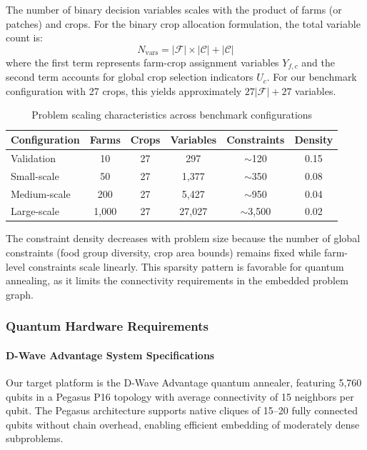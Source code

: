 \documentclass{oqireport}
\begin{document}
The number of binary decision variables scales with the product of farms (or patches) and crops. For the binary crop allocation formulation, the total variable count is:
\begin{equation}
N_{\text{vars}} = |\mathcal{F}| \times |\mathcal{C}| + |\mathcal{C}|
\end{equation}
where the first term represents farm-crop assignment variables $Y_{f,c}$ and the second term accounts for global crop selection indicators $U_c$. For our benchmark configuration with 27 crops, this yields approximately $27|\mathcal{F}| + 27$ variables.

\begin{table}[H]
\centering
\caption{Problem scaling characteristics across benchmark configurations}
\label{tab:problem_scaling}
\begin{tabular}{@{}lccccc@{}}
\toprule
\textbf{Configuration} & \textbf{Farms} & \textbf{Crops} & \textbf{Variables} & \textbf{Constraints} & \textbf{Density} \\
\midrule
Validation & 10 & 27 & 297 & $\sim$120 & 0.15 \\
Small-scale & 50 & 27 & 1,377 & $\sim$350 & 0.08 \\
Medium-scale & 200 & 27 & 5,427 & $\sim$950 & 0.04 \\
Large-scale & 1,000 & 27 & 27,027 & $\sim$3,500 & 0.02 \\
\bottomrule
\end{tabular}
\end{table}

The constraint density decreases with problem size because the number of global constraints (food group diversity, crop area bounds) remains fixed while farm-level constraints scale linearly. This sparsity pattern is favorable for quantum annealing, as it limits the connectivity requirements in the embedded problem graph.

\subsubsection{Quantum Hardware Requirements}

\paragraph{D-Wave Advantage System Specifications}

Our target platform is the D-Wave Advantage quantum annealer, featuring 5,760 qubits in a Pegasus P16 topology with average connectivity of 15 neighbors per qubit. The Pegasus architecture supports native cliques of 15--20 fully connected qubits without chain overhead, enabling efficient embedding of moderately dense subproblems.
\end{document}
